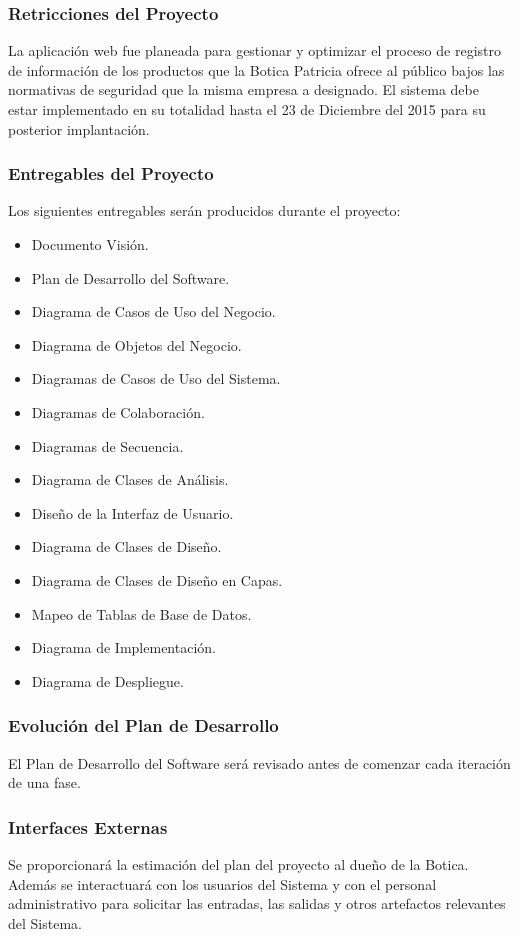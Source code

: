 \documentclass[a4paper,11pt, spanish]{report}
\begin{document}
{{{{{{{{    \subsubsection{Retricciones del Proyecto}
        La aplicación web fue planeada para gestionar y optimizar el proceso de registro de información de los productos que la Botica Patricia ofrece al público bajos las normativas de seguridad que la misma empresa a designado. El sistema debe estar implementado en su totalidad hasta el 23 de Diciembre del 2015 para su posterior implantación.
    \subsubsection{Entregables del Proyecto}
        Los siguientes entregables serán producidos durante el proyecto:
            \begin{itemize}
            \item Documento Visión.
            \item Plan de Desarrollo del Software.
            \item Diagrama de Casos de Uso del Negocio.
            \item Diagrama de Objetos del Negocio.
            \item Diagramas de Casos de Uso del Sistema.
            \item Diagramas de Colaboración.
            \item Diagramas de Secuencia.
            \item Diagrama de Clases de Análisis.
            \item Diseño de la Interfaz de Usuario.
            \item Diagrama de Clases de Diseño.
            \item Diagrama de Clases de Diseño en Capas.
            \item Mapeo de Tablas de Base de Datos.
            \item Diagrama de Implementación.
            \item Diagrama de Despliegue.
            \end {itemize}
    \subsubsection{Evolución del Plan de Desarrollo}
        El Plan de Desarrollo del Software será revisado antes de comenzar cada iteración de una fase.
    \subsubsection{Interfaces Externas}
        Se proporcionará la estimación del plan del proyecto al dueño de la Botica. Además se interactuará con los usuarios del Sistema y con el personal administrativo para solicitar las entradas, las salidas y otros artefactos relevantes del Sistema.
}}}}}}}}
\end{document}
